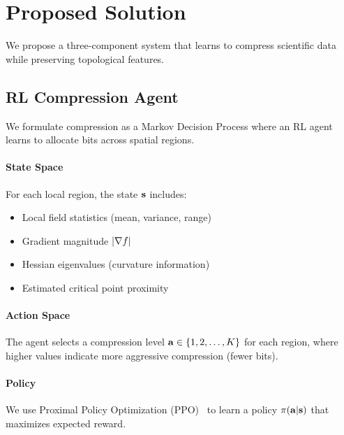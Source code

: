 \section{Proposed Solution}
\label{sec:method}


We propose a three-component system that learns to compress scientific data while preserving topological features.


\subsection{RL Compression Agent}

We formulate compression as a Markov Decision Process where an RL agent learns to allocate bits across spatial regions.

\paragraph{State Space}
For each local region, the state $\mathbf{s}$ includes:
\begin{itemize}
    \item Local field statistics (mean, variance, range)
    \item Gradient magnitude $|\nabla f|$
    \item Hessian eigenvalues (curvature information)
    \item Estimated critical point proximity
\end{itemize}

\paragraph{Action Space}
The agent selects a compression level $\mathbf{a} \in \{1, 2, \ldots, K\}$ for each region, where higher values indicate more aggressive compression (fewer bits).

\paragraph{Policy}
We use Proximal Policy Optimization (PPO)~\cite{ppo2017} to learn a policy $\pi(\mathbf{a} | \mathbf{s})$ that maximizes expected reward.

